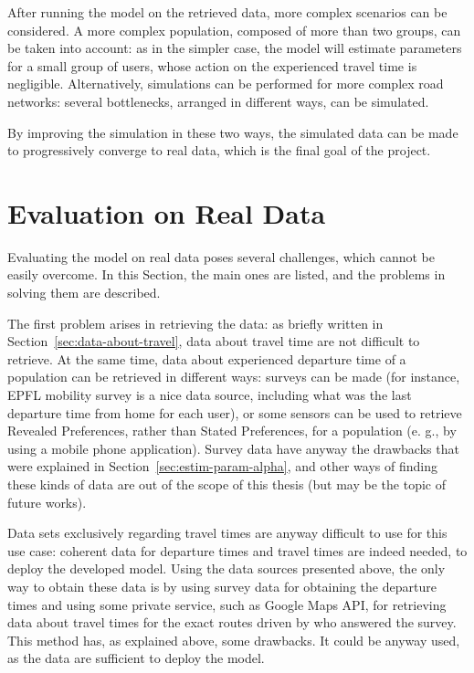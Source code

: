 After running the model on the retrieved data, more complex scenarios can be considered.
A more complex population, composed of more than two groups, can be taken into account:
as in the simpler case, the model will estimate parameters for a small group of users,
whose action on the experienced travel time is negligible.
Alternatively, simulations can be performed for more complex road networks:
several bottlenecks, arranged in different ways, can be simulated.

By improving the simulation in these two ways,
the simulated data can be made to progressively converge to real data,
which is the final goal of the project.

\section{Evaluation on Real Data}
\label{sec:eval_real}

Evaluating the model on real data poses several challenges,
which cannot be easily overcome.
In this Section, the main ones are listed, and the problems in solving them are described.

The first problem arises in retrieving the data:
as briefly written in Section~\ref{sec:data-about-travel},
data about travel time are not difficult to retrieve.
At the same time, data about experienced departure time of a population can be retrieved in different ways:
surveys can be made (for instance, EPFL mobility survey is a nice data source, including what was the last departure time from home for each user),
or some sensors can be used to retrieve Revealed Preferences, rather than Stated Preferences,
for a population (e. g., by using a mobile phone application).
Survey data have anyway the drawbacks that were explained in Section~\ref{sec:estim-param-alpha},
and other ways of finding these kinds of data are out of the scope of this thesis
(but may be the topic of future works).

Data sets exclusively regarding travel times are anyway difficult to use for this use case:
coherent data for departure times and travel times are indeed needed,
to deploy the developed model.
Using the data sources presented above,
the only way to obtain these data is by using survey data for obtaining the departure times and using some private service,
such as Google Maps API,
for retrieving data about travel times for the exact routes driven by who answered the survey.
This method has, as explained above, some drawbacks.
It could be anyway used, as the data are sufficient to deploy the model.

